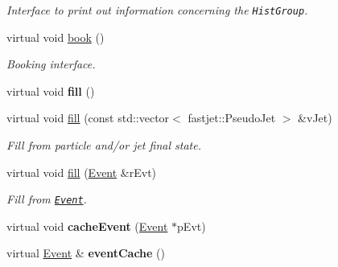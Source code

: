 \begin{CompactItemize}
\begin{CompactList}\small\item\em Interface to print out information concerning the {\tt Hist\-Group}. \item\end{CompactList}\item 
\hypertarget{classHistGroupBase_3734d161250826aa2bb02cb3a144be4a}{
virtual void \hyperlink{classHistGroupBase_3734d161250826aa2bb02cb3a144be4a}{book} ()}
\label{classHistGroupBase_3734d161250826aa2bb02cb3a144be4a}

\begin{CompactList}\small\item\em Booking interface. \item\end{CompactList}\item 
\hypertarget{classHistGroupBase_0346b6f154672b6f4b17a68a9976328a}{
virtual void \textbf{fill} ()}
\label{classHistGroupBase_0346b6f154672b6f4b17a68a9976328a}

\item 
virtual void \hyperlink{classHistGroupBase_ea81dcbe971622e6c6f4f8c5bea582d2}{fill} (const std::vector$<$ fastjet::Pseudo\-Jet $>$ \&v\-Jet)
\begin{CompactList}\small\item\em Fill from particle and/or jet final state. \item\end{CompactList}\item 
virtual void \hyperlink{classHistGroupBase_746a5fc493cc64c27e8274757034ecec}{fill} (\hyperlink{classEvent}{Event} \&r\-Evt)
\begin{CompactList}\small\item\em Fill from {\tt \hyperlink{classEvent}{Event}}. \item\end{CompactList}\item 
\hypertarget{classHistGroupBase_0b468e45cc0548f58e8fafdcab247bd9}{
virtual void \textbf{cache\-Event} (\hyperlink{classEvent}{Event} $\ast$p\-Evt)}
\label{classHistGroupBase_0b468e45cc0548f58e8fafdcab247bd9}

\item 
\hypertarget{classHistGroupBase_8326ebb6deaa255942b1cf233a4b47bf}{
virtual \hyperlink{classEvent}{Event} \& \textbf{event\-Cache} ()}
\label{classHistGroupBase_8326ebb6deaa255942b1cf233a4b47bf}

\end{CompactItemize}
